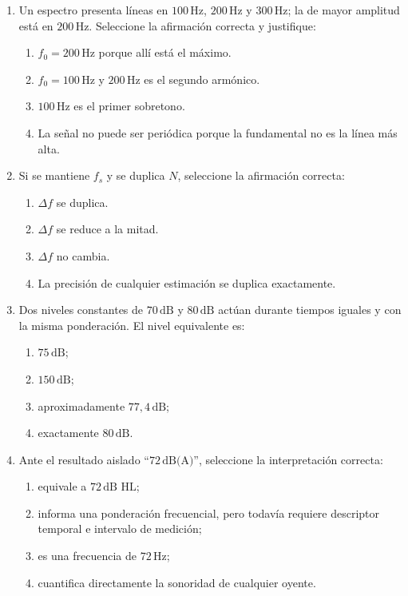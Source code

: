\begin{enumerate}[label=\textbf{D\arabic*.},leftmargin=*]
    \item Un espectro presenta líneas en \(100\,\text{Hz}\),
    \(200\,\text{Hz}\) y \(300\,\text{Hz}\); la de mayor amplitud está en
    \(200\,\text{Hz}\). Seleccione la afirmación correcta y justifique:
    \begin{enumerate}[label=\alph*)]
        \item \(f_0=200\,\text{Hz}\) porque allí está el máximo.
        \item \(f_0=100\,\text{Hz}\) y \(200\,\text{Hz}\) es el segundo
        armónico.
        \item \(100\,\text{Hz}\) es el primer sobretono.
        \item La señal no puede ser periódica porque la fundamental no es la
        línea más alta.
    \end{enumerate}

    \item Si se mantiene \(f_s\) y se duplica \(N\), seleccione la afirmación
    correcta:
    \begin{enumerate}[label=\alph*)]
        \item \(\Delta f\) se duplica.
        \item \(\Delta f\) se reduce a la mitad.
        \item \(\Delta f\) no cambia.
        \item La precisión de cualquier estimación se duplica exactamente.
    \end{enumerate}

    \item Dos niveles constantes de \(70\,\text{dB}\) y
    \(80\,\text{dB}\) actúan durante tiempos iguales y con la misma
    ponderación. El nivel equivalente es:
    \begin{enumerate}[label=\alph*)]
        \item \(75\,\text{dB}\);
        \item \(150\,\text{dB}\);
        \item aproximadamente \(77{,}4\,\text{dB}\);
        \item exactamente \(80\,\text{dB}\).
    \end{enumerate}

    \item Ante el resultado aislado ``\(72\,\text{dB(A)}\)'', seleccione la
    interpretación correcta:
    \begin{enumerate}[label=\alph*)]
        \item equivale a \(72\,\text{dB HL}\);
        \item informa una ponderación frecuencial, pero todavía requiere
        descriptor temporal e intervalo de medición;
        \item es una frecuencia de \(72\,\text{Hz}\);\par
        \item cuantifica directamente la sonoridad de cualquier oyente.
    \end{enumerate}
\end{enumerate}

